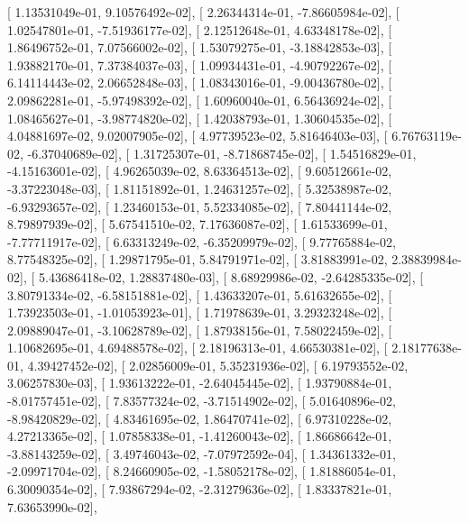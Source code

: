 \documentclass{article}
\begin{document}
       [  1.13531049e-01,   9.10576492e-02],
       [  2.26344314e-01,  -7.86605984e-02],
       [  1.02547801e-01,  -7.51936177e-02],
       [  2.12512648e-01,   4.63348178e-02],
       [  1.86496752e-01,   7.07566002e-02],
       [  1.53079275e-01,  -3.18842853e-03],
       [  1.93882170e-01,   7.37384037e-03],
       [  1.09934431e-01,  -4.90792267e-02],
       [  6.14114443e-02,   2.06652848e-03],
       [  1.08343016e-01,  -9.00436780e-02],
       [  2.09862281e-01,  -5.97498392e-02],
       [  1.60960040e-01,   6.56436924e-02],
       [  1.08465627e-01,  -3.98774820e-02],
       [  1.42038793e-01,   1.30604535e-02],
       [  4.04881697e-02,   9.02007905e-02],
       [  4.97739523e-02,   5.81646403e-03],
       [  6.76763119e-02,  -6.37040689e-02],
       [  1.31725307e-01,  -8.71868745e-02],
       [  1.54516829e-01,  -4.15163601e-02],
       [  4.96265039e-02,   8.63364513e-02],
       [  9.60512661e-02,  -3.37223048e-03],
       [  1.81151892e-01,   1.24631257e-02],
       [  5.32538987e-02,  -6.93293657e-02],
       [  1.23460153e-01,   5.52334085e-02],
       [  7.80441144e-02,   8.79897939e-02],
       [  5.67541510e-02,   7.17636087e-02],
       [  1.61533699e-01,  -7.77711917e-02],
       [  6.63313249e-02,  -6.35209979e-02],
       [  9.77765884e-02,   8.77548325e-02],
       [  1.29871795e-01,   5.84791971e-02],
       [  3.81883991e-02,   2.38839984e-02],
       [  5.43686418e-02,   1.28837480e-03],
       [  8.68929986e-02,  -2.64285335e-02],
       [  3.80791334e-02,  -6.58151881e-02],
       [  1.43633207e-01,   5.61632655e-02],
       [  1.73923503e-01,  -1.01053923e-01],
       [  1.71978639e-01,   3.29323248e-02],
       [  2.09889047e-01,  -3.10628789e-02],
       [  1.87938156e-01,   7.58022459e-02],
       [  1.10682695e-01,   4.69488578e-02],
       [  2.18196313e-01,   4.66530381e-02],
       [  2.18177638e-01,   4.39427452e-02],
       [  2.02856009e-01,   5.35231936e-02],
       [  6.19793552e-02,   3.06257830e-03],
       [  1.93613222e-01,  -2.64045445e-02],
       [  1.93790884e-01,  -8.01757451e-02],
       [  7.83577324e-02,  -3.71514902e-02],
       [  5.01640896e-02,  -8.98420829e-02],
       [  4.83461695e-02,   1.86470741e-02],
       [  6.97310228e-02,   4.27213365e-02],
       [  1.07858338e-01,  -1.41260043e-02],
       [  1.86686642e-01,  -3.88143259e-02],
       [  3.49746043e-02,  -7.07972592e-04],
       [  1.34361332e-01,  -2.09971704e-02],
       [  8.24660905e-02,  -1.58052178e-02],
       [  1.81886054e-01,   6.30090354e-02],
       [  7.93867294e-02,  -2.31279636e-02],
       [  1.83337821e-01,   7.63653990e-02],
\end{document}
